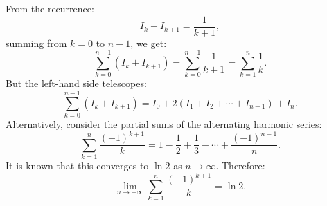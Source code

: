 \documentclass[12pt]{article}
\begin{document}
\begin{answerbox}
\begin{enumerate}
    From the recurrence:
    $$
    I_k + I_{k+1} = \frac{1}{k + 1},
    $$
    summing from $ k = 0 $ to $ n - 1 $, we get:
    $$
    \sum_{k=0}^{n-1} (I_k + I_{k+1}) = \sum_{k=0}^{n-1} \frac{1}{k + 1} = \sum_{k=1}^{n} \frac{1}{k}.
    $$
    But the left-hand side telescopes:
    $$
    \sum_{k=0}^{n-1} (I_k + I_{k+1}) = I_0 + 2(I_1 + I_2 + \cdots + I_{n-1}) + I_n.
    $$
    Alternatively, consider the partial sums of the alternating harmonic series:
    $$
    \sum_{k=1}^n \frac{(-1)^{k+1}}{k} = 1 - \frac{1}{2} + \frac{1}{3} - \cdots + \frac{(-1)^{n+1}}{n}.
    $$
    It is known that this converges to $ \ln 2 $ as $ n \to \infty $. Therefore:
    $$
    \lim_{n \to +\infty} \sum_{k=1}^n \frac{(-1)^{k+1}}{k} = \ln 2.
    $$

\end{enumerate}
\end{answerbox}

\end{document}
